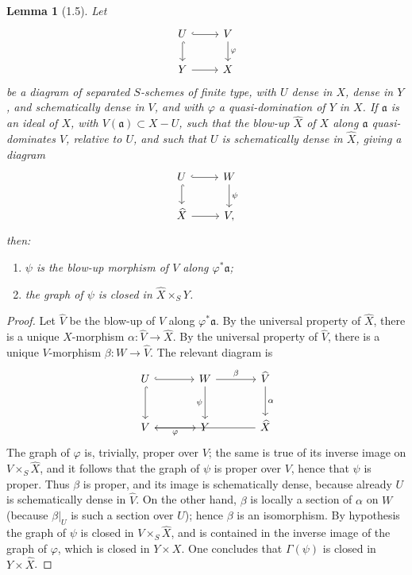 \documentclass[11pt]{article}
\newtheorem*{lemma}{Lemma}
\newcommand{\wh}[1]{\widehat{#1}}
\begin{document}
\begin{lemma}[1.5]
Let
\[
\begin{tikzcd}
U \ar[r,hook] \ar[d,hook] & V \ar[d,"\varphi"] \\
Y \ar[r] & X
\end{tikzcd}
\]
be a diagram of separated \(S\)-schemes of finite type, with \(U\) dense in \(X\), dense in \(Y\), and schematically dense in \(V\), and with \(\varphi\) a quasi-domination of \(Y\) in \(X\). If \(\mathfrak a\) is an ideal of \(X\), with \(V(\mathfrak a)\subset X-U\), such that the blow-up \(\wh X\) of \(X\) along \(\mathfrak a\) quasi-dominates \(V\), relative to \(U\), and such that \(U\) is schematically dense in \(\wh X\), giving a diagram
\[
\begin{tikzcd}
U \ar[r,hook] \ar[d,hook] & W \ar[d,"\psi"] \\
\wh X \ar[r] & V,
\end{tikzcd}
\]
then:
\begin{enumerate}[label=(\alph*)]
\item \(\psi\) is the blow-up morphism of \(V\) along \(\varphi^*\mathfrak a\);
\item the graph of \(\psi\) is closed in \(\wh X\times_S Y\).
\end{enumerate}
\end{lemma}

\begin{proof}
Let \(\wh V\) be the blow-up of \(V\) along \(\varphi^*\mathfrak a\). By the universal property of \(\wh X\), there is a unique \(X\)-morphism \(\alpha:\wh V\to \wh X\). By the universal property of \(\wh V\), there is a unique \(V\)-morphism \(\beta:W\to \wh V\). The relevant diagram is
\[
\begin{tikzcd}[column sep=large,row sep=large]
U \ar[r,hook] \ar[d,hook] & W \ar[r,"\beta"] \ar[d,"\psi"'] & \wh V \ar[d,"\alpha"] \\
V \ar[r,"\varphi"'] & Y & \wh X \ar[ll]
\end{tikzcd}
\]
The graph of \(\varphi\) is, trivially, proper over \(V\); the same is true of its inverse image on \(V\times_S\wh X\), and it follows that the graph of \(\psi\) is proper over \(V\), hence that \(\psi\) is proper. Thus \(\beta\) is proper, and its image is schematically dense, because already \(U\) is schematically dense in \(\wh V\). On the other hand, \(\beta\) is locally a section of \(\alpha\) on \(W\) (because \(\beta|_U\) is such a section over \(U\)); hence \(\beta\) is an isomorphism. By hypothesis the graph of \(\psi\) is closed in \(V\times_S\wh X\), and is contained in the inverse image of the graph of \(\varphi\), which is closed in \(Y\times X\). One concludes that \(\Gamma(\psi)\) is closed in \(Y\times\wh X\).
\end{proof}
\end{document}
